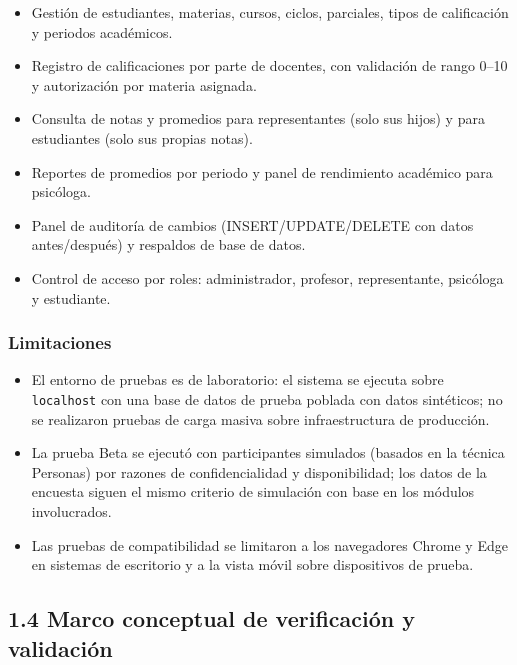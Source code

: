 \documentclass[11pt,a4paper]{article}
\begin{document}
\begin{itemize}[leftmargin=*]
\item Gestión de estudiantes, materias, cursos, ciclos, parciales, tipos de calificación y periodos académicos.
\item Registro de calificaciones por parte de docentes, con validación de rango 0--10 y autorización por materia asignada.
\item Consulta de notas y promedios para representantes (solo sus hijos) y para estudiantes (solo sus propias notas).
\item Reportes de promedios por periodo y panel de rendimiento académico para psicóloga.
\item Panel de auditoría de cambios (INSERT/UPDATE/DELETE con datos antes/después) y respaldos de base de datos.
\item Control de acceso por roles: administrador, profesor, representante, psicóloga y estudiante.
\end{itemize}


\subsubsection*{Limitaciones}


\begin{itemize}[leftmargin=*]
\item El entorno de pruebas es de laboratorio: el sistema se ejecuta sobre \texttt{localhost} con una base de datos de prueba poblada con datos sintéticos; no se realizaron pruebas de carga masiva sobre infraestructura de producción.
\item La prueba Beta se ejecutó con participantes simulados (basados en la técnica Personas) por razones de confidencialidad y disponibilidad; los datos de la encuesta siguen el mismo criterio de simulación con base en los módulos involucrados.
\item Las pruebas de compatibilidad se limitaron a los navegadores Chrome y Edge en sistemas de escritorio y a la vista móvil sobre dispositivos de prueba.
\end{itemize}


\subsection*{1.4 Marco conceptual de verificación y validación}
\end{document}
